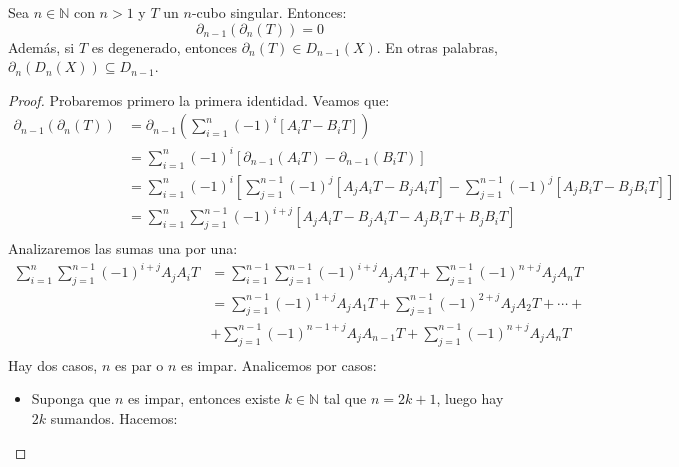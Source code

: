 \documentclass[12pt]{report}
\newcounter{it}
\theoremstyle{largebreak}
\begin{document}
    \begin{propo}
        Sea $n\in\mathbb{N}$ con $n>1$ y $T$ un $n$-cubo singular. Entonces:
        \begin{equation*}
            \partial_{ n-1}\left(\partial_n\left(T\right) \right)=0
        \end{equation*}
        Además, si $T$ es degenerado, entonces $\partial_n\left(T\right)\in D_{ n-1}(X)$. En otras palabras, $\partial_n(D_n(X))\subseteq D_{n-1}$. 
    \end{propo}

    \begin{proof}
        Probaremos primero la primera identidad. Veamos que:
        \begin{equation*}
            \begin{split}
                \partial_{ n-1}\left(\partial_n\left(T\right) \right)&=\partial_{ n-1}\left(\sum_{ i=1}^n (-1)^i\left[A_iT-B_iT \right] \right)\\
                &=\sum_{ i=1}^n (-1)^i\left[\partial_{ n-1}\left(A_iT\right)-\partial_{ n-1}\left(B_iT\right)\right]\\
                &=\sum_{ i=1}^n (-1)^i\left[\sum_{ j=1}^{n-1} (-1)^j\left[A_jA_iT-B_jA_iT \right]-\sum_{ j=1}^{n-1} (-1)^j\left[A_jB_iT-B_jB_iT \right]\right]\\
                &=\sum_{ i=1}^n \sum_{ j=1}^{n-1}(-1)^{i+j} \left[A_jA_iT-B_jA_iT-A_jB_iT+B_jB_iT\right]\\
            \end{split}
        \end{equation*}
        Analizaremos las sumas una por una:
        \begin{equation*}
            \begin{split}
                \sum_{ i=1}^n \sum_{ j=1}^{n-1}(-1)^{i+j}A_jA_iT&=\sum_{ i=1}^{ n-1}\sum_{ j=1}^{n-1}(-1)^{i+j}A_jA_iT+\sum_{ j=1}^{n-1}(-1)^{n+j}A_jA_nT\\
                &=\sum_{ j=1}^{n-1}(-1)^{1+j}A_jA_1T+\sum_{ j=1}^{n-1}(-1)^{2+j}A_jA_2T+\cdots+\\
                &+\sum_{ j=1}^{n-1}(-1)^{n-1+j}A_jA_{ n-1}T+\sum_{ j=1}^{n-1}(-1)^{n+j}A_jA_nT\\
            \end{split}
        \end{equation*}
        Hay dos casos, $n$ es par o $n$ es impar. Analicemos por casos:
        \begin{itemize}
            \item Suponga que $n$ es impar, entonces existe $k\in\mathbb{N}$ tal que $n=2k+1$, luego hay $2k$ sumandos. Hacemos:

\end{itemize}
\end{proof}
\end{document}
